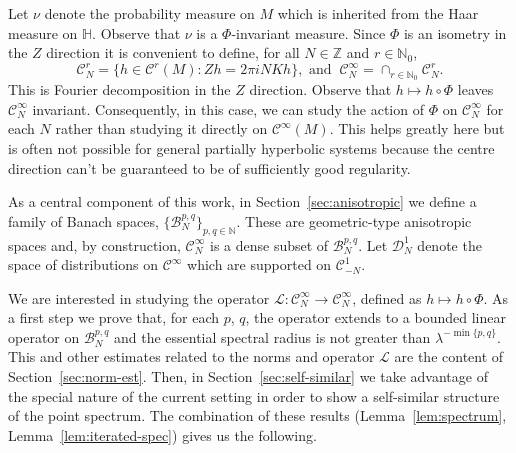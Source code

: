 \documentclass[a4paper,11pt]{amsart}
\theoremstyle{remark}
\newcommand{\cB}{\mathcal{B}} %
\newcommand{\cC}{\mathcal{C}} %
\newcommand{\cD}{\mathcal{D}} %
\newcommand{\cL}{\mathcal{L}} %
\newcommand{\bN}{\mathbb{N}} %
\newcommand{\bZ}{\mathbb{Z}} %
\newcommand{\bH}{\mathbb{H}} %
\newcommand{\dz}{Z} %
\begin{document}
Let \(\nu\) denote the probability measure on $M$ which is inherited from the Haar measure on \(\bH\).
Observe that \(\nu\) is a \(\Phi\)-invariant measure.
Since \(\Phi\) is an isometry in the \(\dz\) direction it is convenient to define, for all \(N\in \bZ\) and \(r\in \bN_0\),
\begin{equation}
    \label{eq:def-CN}
    \cC_N^r = \{h \in \cC^r(M) : \dz h = 2\pi i NK h\}, \text{ and } \ \cC_N^\infty = \cap_{r \in \bN_0} \cC_N^r.
\end{equation}
This is Fourier decomposition in the \(\dz\) direction.
Observe that \(h\mapsto h\circ \Phi\) leaves \(\cC_N^\infty\) invariant.
Consequently, in this case, we can study the action of \(\Phi\) on \(\cC_N^\infty\) for each \(N\) rather than studying it directly on \(\cC^\infty(M)\). 
This helps greatly here but is often not possible for general partially hyperbolic systems because the centre direction can't be guaranteed to be of sufficiently good regularity.

As a central component of this work, in Section~\ref{sec:anisotropic} we define a family of Banach spaces, \(\{\cB_{N}^{p,q}\}_{p,q \in \bN}\).
These are geometric-type anisotropic spaces and, by construction, \(\cC_{N}^\infty\) is a dense subset of \(\cB_{N}^{p,q}\).
Let \(\cD_N^1\) denote the space of distributions on \(\cC^\infty\) which are supported on \(\cC^1_{-N}\).

We are interested in studying the operator \(\cL : \cC_{N}^\infty \to \cC_{N}^\infty\), defined as \(h \mapsto h \circ \Phi\).
As a first step we prove that, for each \(p\), \(q\), the operator extends to a bounded linear operator on \(\cB_{N}^{p,q}\) and the essential spectral radius is not greater than \(\lambda^{-\min{\{p,q\}}}\).
This and other estimates related to the norms and operator \(\cL\) are the content of Section~\ref{sec:norm-est}.
Then, in Section~\ref{sec:self-similar} we take advantage of the special nature of the current setting in order to show a self-similar structure of the point spectrum. 
The combination of these results (Lemma~\ref{lem:spectrum}, Lemma~\ref{lem:iterated-spec}) gives us the following.
\end{document}
